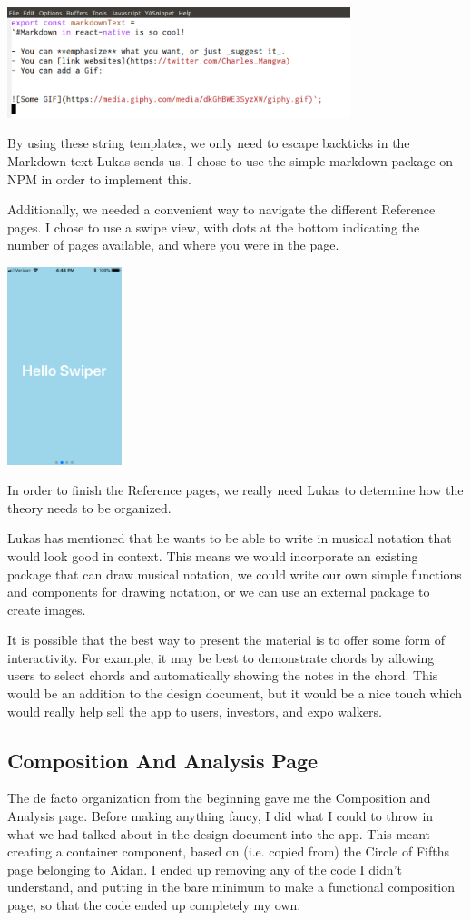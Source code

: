 \documentclass[onecolumn, draftclsnofoot,10pt, compsoc]{IEEEtran}
\begin{document}
\includegraphics[width=0.75\textwidth]{markdown-code}

By using these string templates, we only need to escape backticks in the Markdown text Lukas sends us.
I chose to use the simple-markdown package on NPM in order to implement this.

Additionally, we needed a convenient way to navigate the different Reference pages. 
I chose to use a swipe view, with dots at the bottom indicating the number of pages available, and where you were in the page.

\includegraphics[width=0.25\textwidth]{swipe}

In order to finish the Reference pages, we really need Lukas to determine how the theory needs to be organized.

Lukas has mentioned that he wants to be able to write in musical notation that would look good in context.
This means we would incorporate an existing package that can draw musical notation, we could write our own simple functions and components for drawing notation, or we can use an external package to create images.

It is possible that the best way to present the material is to offer some form of interactivity.
For example, it may be best to demonstrate chords by allowing users to select chords and automatically showing the notes in the chord.
This would be an addition to the design document, but it would be a nice touch which would really help sell the app to users, investors, and expo walkers.

\subsection{Composition And Analysis Page}
The de facto organization from the beginning gave me the Composition and Analysis page.
Before making anything fancy, I did what I could to throw in what we had talked about in the design document into the app.
This meant creating a container component, based on (i.e. copied from) the Circle of Fifths page belonging to Aidan.
I ended up removing any of the code I didn’t understand, and putting in the bare minimum to make a functional composition page, so that the code ended up completely my own.
\end{document}
